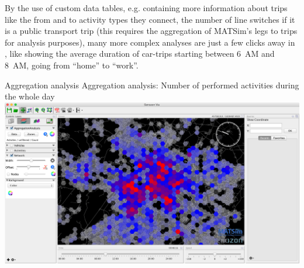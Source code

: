 By the use of custom data tables, e.g. containing more information about trips
like the from and to activity types they connect, the number of line switches if
it is a public transport trip (this requires the aggregation of MATSim's legs
to trips for analysis purposes), many more complex analyses are just a few
clicks away in \Via{}, like showing the average duration of car-trips starting
between 6~AM and 8~AM, going from ``home'' to ``work''.


\createfigure%
{Aggregation analysis}%
{Aggregation analysis: Number of performed activities during the whole day}%
{\label{fig:via:aggregation}}%
{\includegraphics[width=1.\textwidth,angle=0]{./extending/figures/via/aggregation}}%
{}


